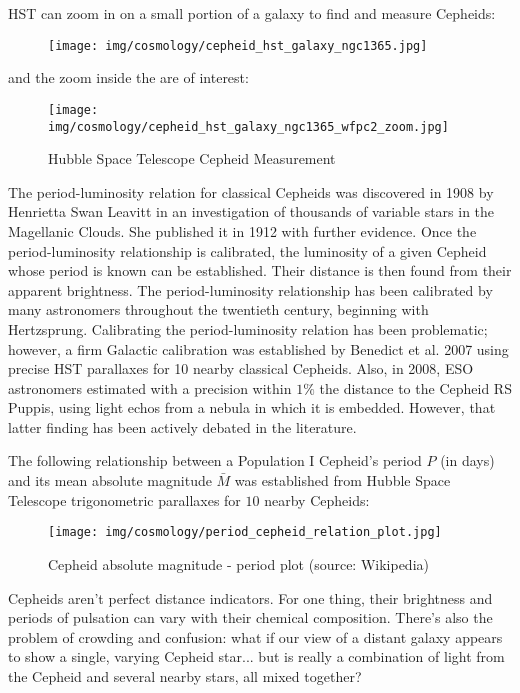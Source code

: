 	HST can zoom in on a small portion of a galaxy to find and measure Cepheids:
	\begin{figure}[H]
		\begin{center}
		\texttt{[image: img/cosmology/cepheid\_hst\_galaxy\_ngc1365.jpg]}
		\end{center}
	\end{figure}
	and the zoom inside the are of interest:
	\begin{figure}[H]
		\begin{center}
		\texttt{[image: img/cosmology/cepheid\_hst\_galaxy\_ngc1365\_wfpc2\_zoom.jpg]}
		\caption{Hubble Space Telescope Cepheid Measurement}
		\end{center}
	\end{figure}
	The period-luminosity relation for classical Cepheids was discovered in 1908 by Henrietta Swan Leavitt in an investigation of thousands of variable stars in the Magellanic Clouds. She published it in 1912 with further evidence. Once the period-luminosity relationship is calibrated, the luminosity of a given Cepheid whose period is known can be established. Their distance is then found from their apparent brightness. The period-luminosity relationship has been calibrated by many astronomers throughout the twentieth century, beginning with Hertzsprung. Calibrating the period-luminosity relation has been problematic; however, a firm Galactic calibration was established by Benedict et al. 2007 using precise HST parallaxes for 10 nearby classical Cepheids. Also, in 2008, ESO astronomers estimated with a precision within $1\%$ the distance to the Cepheid RS Puppis, using light echos from a nebula in which it is embedded. However, that latter finding has been actively debated in the literature.

	The following relationship between a Population I Cepheid's period $P$ (in days) and its mean absolute magnitude $\bar{M}$ was established from Hubble Space Telescope trigonometric parallaxes for $10$ nearby Cepheids:
	
	\begin{figure}[H]
		\begin{center}
		\texttt{[image: img/cosmology/period\_cepheid\_relation\_plot.jpg]}
		\caption[Cepheid absolute magnitude - period plot]{Cepheid absolute magnitude - period plot (source: Wikipedia)}
		\end{center}
	\end{figure}
	Cepheids aren't perfect distance indicators. For one thing, their brightness and periods of pulsation can vary with their chemical composition. There's also the problem of crowding and confusion: what if our view of a distant galaxy appears to show a single, varying Cepheid star... but is really a combination of light from the Cepheid and several nearby stars, all mixed together?
	
